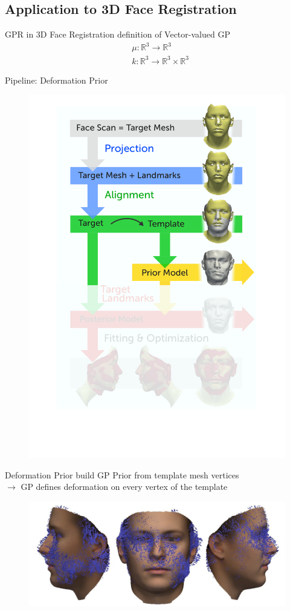 \documentclass[xcolor=x11names,compress]{beamer}
\begin{document}
\subsection{Application to 3D Face Registration}
\begin{frame}{GPR in 3D Face Registration}
definition of Vector-valued GP
\begin{align*}
& \mu: \mathbb{R}^3 \rightarrow \mathbb{R}^3\\
& k: \mathbb{R}^3 \rightarrow \mathbb{R}^3 \times \mathbb{R}^3
\end{align*}
\end{frame}

\begin{frame}{Pipeline: Deformation Prior}
\begin{figure}   
\centering
\includegraphics[width=.6\textwidth]{../resources/figures/pipeline_prior.pdf}
\end{figure}
\end{frame}

\begin{frame}{Deformation Prior}
build GP Prior from template mesh vertices\\
$\rightarrow$ GP defines deformation on every vertex of the template
\begin{figure}
    \centering
\includegraphics[width=.6\textwidth]{../resources/img/prior_deformations.pdf}
\end{figure}
\end{frame}
\end{document}
